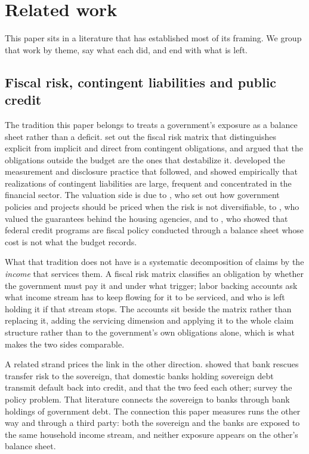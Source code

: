 \section{Related work}
\label{sec:related}

This paper sits in a literature that has established most of its framing. We group that work by
theme, say what each did, and end with what is left.

\subsection{Fiscal risk, contingent liabilities and public credit}

The tradition this paper belongs to treats a government's exposure as a balance sheet rather than
a deficit. \citet{Polackova1998} set out the fiscal risk matrix that distinguishes explicit from
implicit and direct from contingent obligations, and argued that the obligations outside the
budget are the ones that destabilize it. \citet{Cebotari2008} developed the measurement and
disclosure practice that followed, and \citet{BovaRuizArranzToscaniTure2019} showed empirically
that realizations of contingent liabilities are large, frequent and concentrated in the financial
sector. The valuation side is due to \citet{Lucas2012}, who set out how government policies and
projects should be priced when the risk is not diversifiable, to \citet{LucasMcDonald2010}, who
valued the guarantees behind the housing agencies, and to \citet{Lucas2016}, who showed that
federal credit programs are fiscal policy conducted through a balance sheet whose cost is not
what the budget records.

What that tradition does not have is a systematic decomposition of claims by the \emph{income}
that services them. A fiscal risk matrix classifies an obligation by whether the government must
pay it and under what trigger; labor backing accounts ask what income stream has to keep flowing
for it to be serviced, and who is left holding it if that stream stops. The accounts sit beside
the matrix rather than replacing it, adding the servicing dimension and applying it to the whole
claim structure rather than to the government's own obligations alone, which is what makes the two
sides comparable.

A related strand prices the link in the other direction. \citet{AcharyaDrechslerSchnabl2014}
showed that bank rescues transfer risk to the sovereign, \citet{GennaioliMartinRossi2014} that
domestic banks holding sovereign debt transmit default back into credit, and
\citet{FarhiTirole2018} that the two feed each other; \citet{DellAricciaEtAl2018} survey the
policy problem. That literature connects the sovereign to banks through bank holdings of
government debt. The connection this paper measures runs the other way and through a third party:
both the sovereign and the banks are exposed to the same household income stream, and neither
exposure appears on the other's balance sheet.

